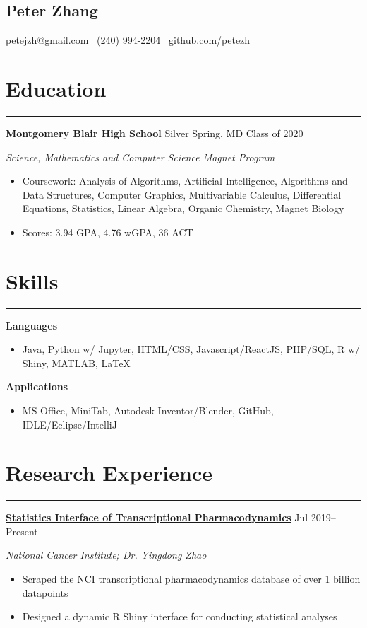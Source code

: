 \documentclass[11pt]{article}
\newcommand{\name}[1]{\begin{center}\section*{\huge \color{highlight} #1}\end{center}}
\newcommand{\topinfo}[1]{\begin{center}\vspace{-0.2cm}#1\vspace{-0.2cm}\end{center}}
\newcommand{\resumesection}[1]{\vspace{-0.3cm}\section*{\color{highlight}#1}\vspace{-0.3cm}\hrule\vspace{0.3cm}}
\begin{document}
\name{Peter Zhang}
\topinfo{petejzh@gmail.com \textbullet\ (240) 994-2204 \textbullet\ github.com/petezh}

\resumesection{Education}

\textbf{Montgomery Blair High School} Silver Spring, MD \hfill Class of 2020 \par
\textit{Science, Mathematics and Computer Science Magnet Program}

\begin{itemize}
	\item Coursework: Analysis of Algorithms, Artificial Intelligence, Algorithms and Data Structures, Computer Graphics, Multivariable Calculus, Differential Equations, Statistics, Linear Algebra, Organic Chemistry, Magnet Biology
	\item Scores: 3.94 GPA, 4.76 wGPA,  36 ACT
\end{itemize}


\resumesection{Skills}

\textbf{Languages}
\begin{itemize} 
	\item Java, Python w/ Jupyter, HTML/CSS, Javascript/ReactJS, PHP/SQL, R w/ Shiny, MATLAB, \LaTeX
\end{itemize}\vspace{0.1cm}

\textbf{Applications}
\begin{itemize} 
	\item MS Office, MiniTab, Autodesk Inventor/Blender, GitHub, IDLE/Eclipse/IntelliJ
\end{itemize}

\resumesection{Research Experience}

\textbf{\href{https://github.com/petezh/TP-Workbench}{Statistics Interface of Transcriptional Pharmacodynamics}} \hfill Jul 2019--Present \par
\textit{National Cancer Institute; Dr. Yingdong Zhao}
\begin{itemize}
	\item Scraped the NCI transcriptional pharmacodynamics database of over 1 billion datapoints
	\item Designed a dynamic R Shiny interface for conducting statistical analyses
\end{itemize}\vspace{0.1cm}
\end{document}
